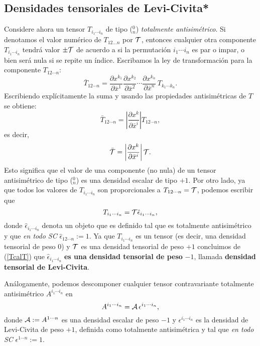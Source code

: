  \subsection{Densidades tensoriales de Levi-Civita*}
 Considere ahora un tensor $T_{i_1\cdots i_n}$ de tipo ($_n^0$)
 \textit{totalmente
 antisimétrico}. Si denotamos el valor numérico de $T_{12\dots n}$ por
 ${\cal T}$, entonces cualquier otra componente $T_{i_1\cdots i_n}$ tendrá
 valor
 $\pm{\cal T}$ de acuerdo a si la permutación $i_1\cdots i_n$ es par o
 impar, o
 bien será nula si se repite un índice. Escribamos la ley de transformación
 para la componente $T_{12\cdots n}$:
 \begin{equation}
 \bar{T}_{12\cdots n}=\frac{\partial
 x^{k_1}}{\partial\bar{x}^1}\frac{\partial
 x^{k_2}}{\partial\bar{x}^2}\cdots \frac{\partial x^{k_n}}{\partial\bar
 {x}^n}\,T_{k_1\cdots k_n}. \label{den8}%
 \end{equation}
 Escribiendo explícitamente la suma y usando las propiedades
 antisimétricas de $T$ se obtiene:
 \begin{equation}
 \bar{T}_{12\cdots n}=\left| \frac{\partial x^k}{\partial\bar{x}^i}\right|
 T_{12\cdots n}, \label{den9}%
 \end{equation}
 es decir,
 \begin{equation}
 \bar{{\cal T}}=\left| \frac{\partial x^k}{\partial\bar{x}^i}\right| {\cal
 T}.
 \label{den10}%
 \end{equation}
 Esto significa que el valor de una componente (no nula) de un tensor
 antisimétrico de tipo ($_n^0$) es una densidad escalar de tipo $+1$. Por
 otro lado, ya que todos los valores de $T_{i_1\cdots i_n}$ son
 proporcionales a $T_{12\cdots n}={\cal T}$, podemos escribir que
 \begin{equation}
 T_{i_1\cdots i_n}={\cal T}\hat{\epsilon}_{i_1\cdots i_n},
 \label{TcalT}
 \end{equation}
 donde $\hat{\epsilon}_{i_1\cdots i_n}$ denota un objeto que es definido
 tal que es totalmente antisimétrico y que \textit{en todo SC}
 $\hat{\epsilon}_{12\cdots n}:=1$. Ya que $T_{i_1\cdots i_n}$ es un tensor
 (es decir, una densidad tensorial de peso $0$) y ${\cal T}$ es una densidad
 tensorial de peso $+1$ concluimos de (\ref{TcalT}) que
 $\hat{\epsilon}_{i_1\cdots i_n}$ \textbf{es una densidad tensorial de
 peso} $-1$, llamada \textbf{densidad tensorial de Levi-Civita}.

 Análogamente, podemos descomponer cualquier tensor contravariante totalmente antisimétrico  $A^{i_1\cdots i_n}$ en
 \begin{equation}
 A^{i_1\cdots i_n}={\cal A}\,\epsilon^{i_1\cdots i_n}, \label{AcalA}
 \end{equation}
 donde ${\cal A}:=A^{1\cdots n}$ es una densidad escalar de peso $-1$ y
 $\epsilon^{i_1\cdots i_n}$ es la densidad de Levi-Civita de peso $+1$,
 definida como totalmente antisimétrica y tal que
 \textit{en todo SC} $\epsilon^{1\cdots n}:=1$.

